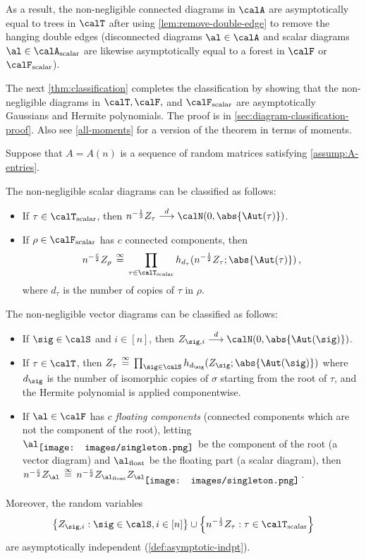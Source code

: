 \documentclass[12pt]{article}
\newcommand{\smallrootpic}{\vcenter{\hbox{\texttt{[image: images/singleton.png]}}}}
\newcommand{\scalar}{\textnormal{scalar}}
\newcommand{\float}{\textnormal{float}}
\newcommand{\eqinf}{\,\overset{\infty}{=}\,}
\begin{document}
As a result, the non-negligible connected diagrams in $\calA$ are asymptotically equal to trees in $\calT$ after using
\cref{lem:remove-double-edge} to remove the hanging
double edges (disconnected diagrams $\al \in \calA$ and scalar diagrams $\al \in \calA_\scalar$ are likewise asymptotically equal to a forest in $\calF$ or $\calF_\scalar$).

The next \cref{thm:classification} completes the classification by showing that the non-negligible diagrams in $\calT, \calF,$ and $\calF_\scalar$
are asymptotically Gaussians and Hermite polynomials.
The proof is in \cref{sec:diagram-classification-proof}.
Also see \cref{all-moments} for a version of the theorem in terms of moments.

\begin{theorem}[Classification]\label{thm:classification}
    Suppose that $A=A(n)$ is a sequence of random matrices satisfying \cref{assump:A-entries}.
    
    The non-negligible scalar diagrams can be classified as follows:
    \begin{itemize}
        \item If $\tau\in\calT_{\scalar}$, then $n^{-\frac 1 2} Z_\tau \overset{d}{\longrightarrow} \calN(0, \abs{\Aut(\tau)})$.
        \item If $\rho \in \calF_{\scalar}$ has $c$ connected components, then 
        \[n^{-\frac c 2} Z_\rho \eqinf \prod_{\tau \in \calT_{\scalar}} h_{d_\tau}(n^{-\frac 1 2}Z_{\tau}; \abs{\Aut(\tau)})\,,\]
        where $d_\tau$ is the number of copies of $\tau$ in $\rho$.
    \end{itemize}
    The non-negligible vector diagrams can be classified as follows:
    \begin{itemize}
        \item If $\sig \in \calS$ and $i\in [n]$, then $Z_{\sig, i} \overset{d}{\longrightarrow} \calN(0, \abs{\Aut(\sig)})$.
        \item If $\tau \in \calT$, then $Z_{\tau} \eqinf \prod_{\sig \in \calS} h_{d_\sig}(Z_{\sig}; \abs{\Aut(\sig)})$
        where $d_\sig$ is the number of isomorphic copies of $\sigma$ starting from the root of $\tau$,
        and the Hermite polynomial is applied componentwise.
        \item If $\al\in \calF$ has $c$ 
        \textit{floating components}
        (connected components which are not the component of the root), letting $\al_{\smallrootpic}$ be the component of the root (a vector diagram) and $\al_{\text{float}}$ be the floating part (a scalar diagram), then $n^{-\frac c 2}Z_\al \eqinf n^{-\frac c 2}Z_{\al_{\float}} Z_{\al_{\smallrootpic}}$.
    \end{itemize}
    Moreover, the random variables
    \[
        \left\{Z_{\sig, i} : \sig \in \calS, i \in [n]\right\} \cup \left\{n^{-\frac 1 2} Z_{\tau} : \tau \in \calT_{\scalar}\right\}
    \]
    are asymptotically independent (\cref{def:asymptotic-indpt}).
\end{theorem}
\end{document}

